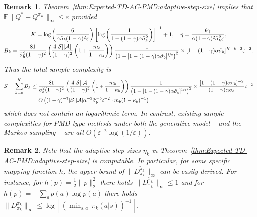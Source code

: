 \documentclass[10pt]{article}
\newcommand{\calA}{\mathcal{A}}
\newcommand{\calS}{\mathcal{S}}
\newcommand{\E}{\mathbb{E}}
\newcommand{\ls}{\left}
\newcommand{\rs}{\right}
\theoremstyle{plain}
\newtheorem{remark}{Remark}[section]
\theoremstyle{definition}
\begin{document}
\begin{remark}
    Theorem~\ref{thm:Expected-TD-AC-PMD:adaptive-step-size} implies that $\E\| Q^* - Q^{\pi_K} \|_\infty \leq \varepsilon$ provided
    \begin{gather*}
        K = \log \ls( \frac{6}{\alpha\tilde\sigma_b(1-\gamma)^2 \varepsilon} \rs) \ls[ \log \ls( \frac{1}{1- (1-\gamma)\alpha\tilde\sigma_b^2} \rs) \rs]^{-1} + 1, \quad
        \eta = \frac{6\gamma}{\alpha(1-\gamma)^2\tilde\sigma_b^2 \varepsilon}, \\
        B_k = \frac{81}{\tilde\sigma_b^2(1-\gamma)^2} \ls( \frac{4|\calS||\calA|}{(1-\gamma)^2}\ls( 1+\frac{m_b}{1-\kappa_b} \rs) \rs) \frac{1}{\ls( 1-[1-(1-\gamma)\alpha\tilde\sigma_b]^{\nicefrac{1}{2}} \rs)^2} \times [1-(1-\gamma)\alpha\tilde\sigma_b]^{K-k-2} \varepsilon^{-2}.
    \end{gather*}
    Thus the total sample complexity is 
    \begin{align*}
        S = \sum_{k=0}^K B_k &\leq \frac{81}{\tilde\sigma_b^2(1-\gamma)^2} \ls( \frac{4|\calS||\calA|}{(1-\gamma)^2}\ls( 1+\frac{m_b}{1-\kappa_b} \rs) \rs) \frac{1}{\ls( 1-[1-(1-\gamma)\alpha\tilde\sigma_b]^{\nicefrac{1}{2}} \rs)^2} \times \frac{[1-(1-\gamma)\alpha\tilde\sigma_b]^{-2}}{(1-\gamma)\alpha\tilde\sigma_b} \varepsilon^{-2} \\
        &= O\ls( (1-\gamma)^{-7} |\calS||\calA| \alpha^{-3} \tilde\sigma_b^{-5} \varepsilon^{-2} \cdot m_b (1-\kappa_b)^{-1} \rs)
    \end{align*}
    which does not contain an logarithmic term. In contrast, existing sample complexities for PMD type methods under both the generative model ~\textup{\citep{Lan_2021,Xiao_2022,Johnson_Pike-Burke_Rebeschini_2023,protopapas2024policy,liu2025tdpmd}} and the Markov  sampling ~\textup{\citep{li2025policy,li2024stochastic}} are all $O(\varepsilon^{-2}\log(1/\varepsilon))$.
    \label{rem:Expected-TD-AC-PMD:adaptive-step-size}
\end{remark}

\begin{remark}
Note that  the adaptive step sizes $\eta_k$ in Theorem~\ref{thm:Expected-TD-AC-PMD:adaptive-step-size} is computable. In particular, for some specific mapping function $h$, the upper bound of $\| D^{\tilde\pi_k}_{\pi_k} \|_\infty$ can be easily derived. For instance, for $h(p)=\frac{1}{2}\|p\|_2^2$ there holds $\| D^{\tilde\pi_k}_{\pi_k} \|_\infty \leq 1$ and for $h(p)=-\sum_a p(a) \log p(a)$ there holds $\| D^{\tilde\pi_k}_{\pi_k} \|_\infty \leq \log [(\min_{s,a} \, \pi_k(a|s))^{-1}]$.
\end{remark}
\end{document}
